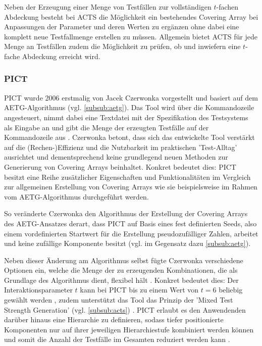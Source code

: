 Neben der Erzeugung einer Menge von Testfällen zur vollständigen $t$-fachen Abdeckung besteht bei ACTS die Möglichkeit ein bestehendes Covering Array bei Anpassungen der Parameter und deren Werten zu ergänzen ohne dabei eine komplett neue Testfallmenge erstellen zu müssen. Allgemein bietet ACTS für jede Menge an Testfällen zudem die Möglichkeit zu prüfen, ob und inwiefern eine $t$-fache Abdeckung erreicht wird.

\subsubsection{PICT}\label{subsub:pict}
PICT \cite{czerwonka2006pairwise, pict} wurde 2006 erstmalig von Jacek Czerwonka vorgestellt und basiert auf dem AETG-Algorithmus (vgl. \autoref{subsub:aetg}). Das Tool wird über die Kommandozeile angesteuert, nimmt dabei eine Textdatei mit der Spezifikation des Testsystems als Eingabe an und gibt die Menge der erzeugten Testfälle auf der Kommandozeile aus \cite{pict}. Czerwonka \cite{czerwonka2006pairwise} betont, dass sich das entwickelte Tool verstärkt auf die (Rechen-)Effizienz und die Nutzbarkeit im praktischen 'Test-Alltag' ausrichtet und dementsprechend keine grundlegend neuen Methoden zur Generierung von Covering Arrays beinhaltet. Konkret bedeutet dies: PICT besitzt eine Reihe zusätzlicher Eigenschaften und Funktionalitäten im Vergleich zur allgemeinen Erstellung von Covering Arrays wie sie beispielsweise im Rahmen vom AETG-Algorithmus durchgeführt werden.

So veränderte Czerwonka den Algorithmus der Erstellung der Covering Arrays des AETG-Ansatzes derart, dass PICT auf Basis eines fest definierten Seeds, also einem vordefinierten Startwert für die Erstellung pseudozufälliger Zahlen, arbeitet und keine zufällige Komponente besitzt (vgl. im Gegensatz dazu \autoref{subsub:aetg}). 

Neben dieser Änderung am Algorithmus selbst fügte Czerwonka verschiedene Optionen ein, welche die Menge der zu erzeugenden Kombinationen, die als Grundlage des Algorithmus dient, flexibel hält \cite{czerwonka2006pairwise}. Konkret bedeutet dies: Der Interaktionsparameter $t$ kann bei PICT bis zu einem Wert von $t = 6$ beliebig gewählt werden \cite{khalsa2014orchestrated}, zudem unterstützt das Tool das Prinzip der 'Mixed Test Strength Generation' (vgl. \autoref{subsub:acts}) \cite{czerwonka2006pairwise}. PICT erlaubt es den Anwendenden darüber hinaus eine Hierarchie zu definieren, sodass tiefer positionierte Komponenten nur auf ihrer jeweiligen Hierarchiestufe kombiniert werden können und somit die Anzahl der Testfälle im Gesamten reduziert werden kann \cite{czerwonka2006pairwise}. 

